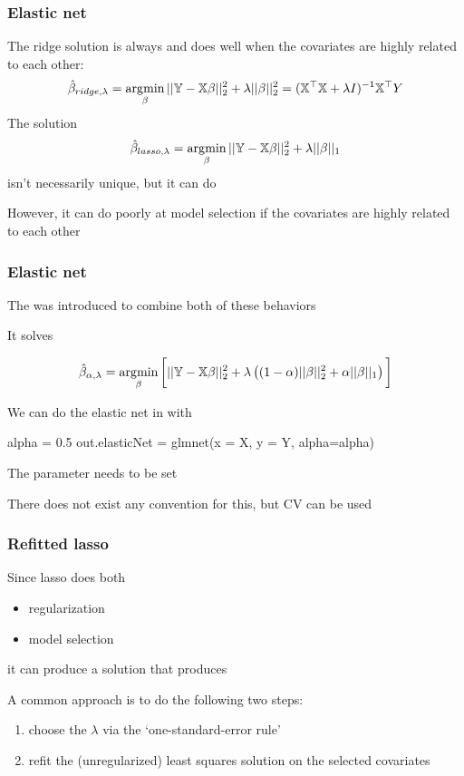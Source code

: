 \documentclass{beamer}
\begin{document}
\begin{frame}[fragile]
\frametitle{Elastic net}
The ridge solution is always  and does well when the covariates are highly related to each other:
\[
\hat\beta_{ridge,\lambda} = \operatorname*{\arg\!\min}_{\beta} ||\mathbb{Y}-\mathbb{X}\beta||_2^2 + \lambda ||\beta||_2^2 = (\mathbb{X}^{\top}\mathbb{X} + \lambda I)^{-1} \mathbb{X}^{\top}Y
\]
The  solution
\[
\hat\beta_{lasso,\lambda} = \operatorname*{\arg\!\min}_{\beta} ||\mathbb{Y}-\mathbb{X}\beta||_2^2 + \lambda ||\beta||_1 
\]
isn't necessarily unique, but it can do 

\vsp
However, it can do poorly at model selection if the covariates are highly related to each other
\end{frame}

\begin{frame}[fragile]
\frametitle{Elastic net}
The  was introduced to combine both of these behaviors

\vsp
It solves

\[
\hat\beta_{\alpha,\lambda} = \operatorname*{\arg\!\min}_{\beta} \bigg[ ||\mathbb{Y}-\mathbb{X}\beta||_2^2 + \lambda \left((1-\alpha) ||\beta||_2^2 
+ \alpha ||\beta||_1\right)\bigg]
\]

We can do the elastic net in  with 
\begin{blockcode}
alpha = 0.5
out.elasticNet = glmnet(x = X, y = Y, alpha=alpha)
\end{blockcode}
\vsp

The parameter  needs to be set 

\vsp
There does not exist any convention for this, but CV can be used

\end{frame}


\begin{frame}[fragile]
\frametitle{Refitted lasso}
Since lasso does both
\begin{itemize}
\item regularization
\item model selection
\end{itemize}
\vsp

it can produce a solution that produces  

\vsp
A common approach is to do the following two steps:
\begin{enumerate}
\item choose the $\lambda$ via the `one-standard-error rule'
\item refit the (unregularized) least squares solution on the selected covariates
\end{enumerate}
\end{frame}
\end{document}
